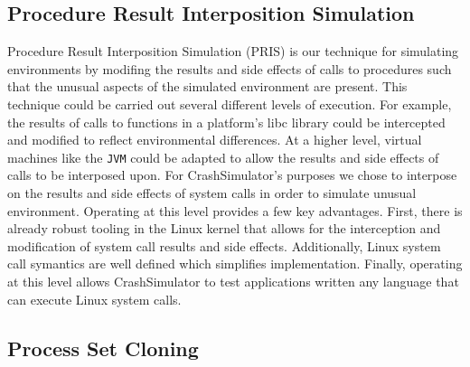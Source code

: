 
\subsection{Procedure Result Interposition Simulation}

Procedure Result Interposition Simulation (PRIS) is our technique for
simulating environments by modifing the results and side effects of calls
to procedures such that the unusual aspects of the simulated environment
are present.  This technique could be carried out several different levels
of execution.  For example, the results of calls to functions in a
platform's libc library could be intercepted and modified to reflect
environmental differences.  At a higher level, virtual machines like the
{\tt JVM} could be adapted to allow the results and side effects of calls
to be interposed upon.  For CrashSimulator's purposes we chose to interpose
on the results and side effects of system calls in order to simulate
unusual environment.  Operating at this level provides a few key
advantages.  First, there is already robust tooling in the Linux kernel
that allows for the interception and modification of system call results
and side effects.  Additionally, Linux system call symantics are well
defined which simplifies implementation.  Finally, operating at this level
allows CrashSimulator to test applications written any language that can
execute Linux system calls.

\subsection{Process Set Cloning}

